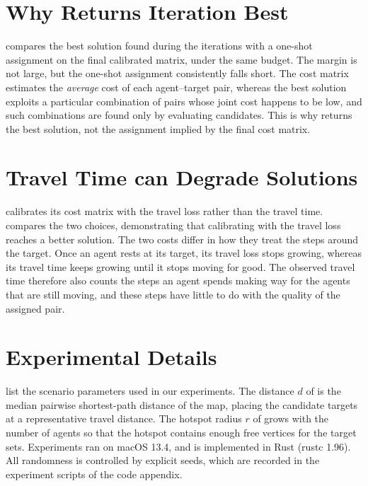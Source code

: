 \section{Why \planner Returns Iteration Best}

 compares the best solution found during the iterations with a one-shot assignment on the final calibrated matrix, under the same budget.
The margin is not large, but the one-shot assignment consistently falls short.
The cost matrix estimates the \emph{average} cost of each agent--target pair, whereas the best solution exploits a particular combination of pairs whose joint cost happens to be low, and such combinations are found only by evaluating candidates.
This is why \planner returns the best solution, not the assignment implied by the final cost matrix.

\section{Travel Time can Degrade Solutions}
\label{sec:loss_vs_time}

\planner calibrates its cost matrix with the travel loss rather than the travel time.
 compares the two choices, demonstrating that calibrating with the travel loss reaches a better solution.
The two costs differ in how they treat the steps around the target.
Once an agent rests at its target, its travel loss stops growing, whereas its travel time keeps growing until it stops moving for good.
The observed travel time therefore also counts the steps an agent spends making way for the agents that are still moving, and these steps have little to do with the quality of the assigned pair.

\section{Experimental Details}


 list the scenario parameters used in our experiments.
The distance $d$ of \scenEqdist is the median pairwise shortest-path distance of the map, placing the candidate targets at a representative travel distance.
The hotspot radius $r$ of \scenHotspot grows with the number of agents so that the hotspot contains enough free vertices for the target sets.
Experiments ran on macOS 13.4, and \planner is implemented in Rust (rustc 1.96).
All randomness is controlled by explicit seeds, which are recorded in the experiment scripts of the code appendix.